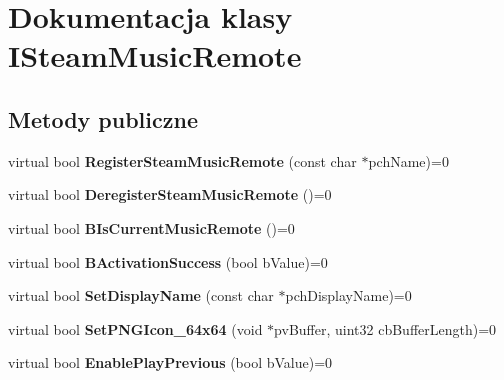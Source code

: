 \hypertarget{class_i_steam_music_remote}{}\section{Dokumentacja klasy I\+Steam\+Music\+Remote}
\label{class_i_steam_music_remote}
\subsection*{Metody publiczne}
\begin{DoxyCompactItemize}
\item 
\mbox{\label{class_i_steam_music_remote_a4f14bf3728b1aef717c9c5f74a3e3f03}} 
virtual bool {\bfseries Register\+Steam\+Music\+Remote} (const char $\ast$pch\+Name)=0
\item 
\mbox{\label{class_i_steam_music_remote_a0df5003b1fe9493eef1ac245681e101b}} 
virtual bool {\bfseries Deregister\+Steam\+Music\+Remote} ()=0
\item 
\mbox{\label{class_i_steam_music_remote_ae5f3636e82985e04027eb9c68bf49ed9}} 
virtual bool {\bfseries B\+Is\+Current\+Music\+Remote} ()=0
\item 
\mbox{\label{class_i_steam_music_remote_ab3cfb4d32e23481cc0f2961e3dace5ad}} 
virtual bool {\bfseries B\+Activation\+Success} (bool b\+Value)=0
\item 
\mbox{\label{class_i_steam_music_remote_a2e27a91a02fa4592cbedf32c6506feb1}} 
virtual bool {\bfseries Set\+Display\+Name} (const char $\ast$pch\+Display\+Name)=0
\item 
\mbox{\label{class_i_steam_music_remote_a62a57c03c0862b98f66a7b6ef6c23c32}} 
virtual bool {\bfseries Set\+P\+N\+G\+Icon\+\_\+64x64} (void $\ast$pv\+Buffer, uint32 cb\+Buffer\+Length)=0
\item 
\mbox{\label{class_i_steam_music_remote_a7dbef87ee956a98ebd422bc7edb094d6}} 
virtual bool {\bfseries Enable\+Play\+Previous} (bool b\+Value)=0
\item 
\mbox{\label{class_i_steam_music_remote_ab3c0a14f73d27ac5a078c1d211c44d1c}} 

\end{DoxyCompactItemize}
